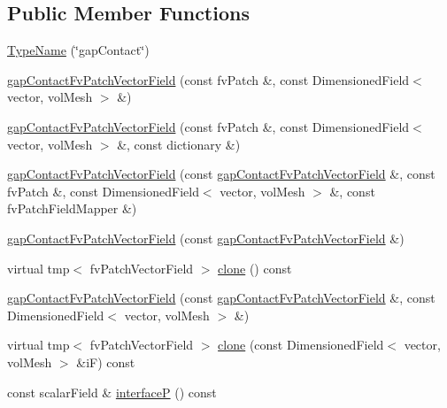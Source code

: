 \subsection*{Public Member Functions}
\begin{DoxyCompactItemize}
\item 
\hyperlink{classFoam_1_1gapContactFvPatchVectorField_acda6365d54c52608d887ddb53538f85f}{Type\+Name} (\char`\"{}gap\+Contact\char`\"{})
\item 
\hyperlink{classFoam_1_1gapContactFvPatchVectorField_a1b260509dca8e2b01322d76e168fcd90}{gap\+Contact\+Fv\+Patch\+Vector\+Field} (const fv\+Patch \&, const Dimensioned\+Field$<$ vector, vol\+Mesh $>$ \&)
\item 
\hyperlink{classFoam_1_1gapContactFvPatchVectorField_a237cd91f79b89ee71a795bf8a988abf7}{gap\+Contact\+Fv\+Patch\+Vector\+Field} (const fv\+Patch \&, const Dimensioned\+Field$<$ vector, vol\+Mesh $>$ \&, const dictionary \&)
\item 
\hyperlink{classFoam_1_1gapContactFvPatchVectorField_ae8104d371f4caf6d42aaa9b143100271}{gap\+Contact\+Fv\+Patch\+Vector\+Field} (const \hyperlink{classFoam_1_1gapContactFvPatchVectorField}{gap\+Contact\+Fv\+Patch\+Vector\+Field} \&, const fv\+Patch \&, const Dimensioned\+Field$<$ vector, vol\+Mesh $>$ \&, const fv\+Patch\+Field\+Mapper \&)
\item 
\hyperlink{classFoam_1_1gapContactFvPatchVectorField_a36ac2bb69cc57ce8790363e7a8c58721}{gap\+Contact\+Fv\+Patch\+Vector\+Field} (const \hyperlink{classFoam_1_1gapContactFvPatchVectorField}{gap\+Contact\+Fv\+Patch\+Vector\+Field} \&)
\item 
virtual tmp$<$ fv\+Patch\+Vector\+Field $>$ \hyperlink{classFoam_1_1gapContactFvPatchVectorField_af0f4bc68c73acc08f11adb3a8957d875}{clone} () const
\item 
\hyperlink{classFoam_1_1gapContactFvPatchVectorField_ac59bcd7a93447be493ecc9fe1c2bc233}{gap\+Contact\+Fv\+Patch\+Vector\+Field} (const \hyperlink{classFoam_1_1gapContactFvPatchVectorField}{gap\+Contact\+Fv\+Patch\+Vector\+Field} \&, const Dimensioned\+Field$<$ vector, vol\+Mesh $>$ \&)
\item 
virtual tmp$<$ fv\+Patch\+Vector\+Field $>$ \hyperlink{classFoam_1_1gapContactFvPatchVectorField_a089f8c8dc7161cb741c2b911efc67d76}{clone} (const Dimensioned\+Field$<$ vector, vol\+Mesh $>$ \&iF) const
\item 
const scalar\+Field \& \hyperlink{classFoam_1_1gapContactFvPatchVectorField_ab1c481a7677071c89600bb5295c7a606}{interfaceP} () const
\item 

\end{DoxyCompactItemize}
